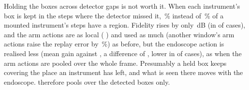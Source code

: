 Holding the boxes across detector gaps is not worth it. When each instrument's box is kept in the steps where the detector missed it, \,\% instead of \,\% of a mounted instrument's steps have a region. Fidelity rises by only \,dB  (in  of  cases), and the arm actions are as local ( ) and used as much (another window's arm actions raise the replay error by \,\%) as before, but the endoscope action is realised less (mean gain  against , a difference of  , lower in  of  cases), as when the arm actions are pooled over the whole frame. Presumably a held box keeps covering the place an instrument has left, and what is seen there moves with the endoscope. \method{} therefore pools over the detected boxes only.


